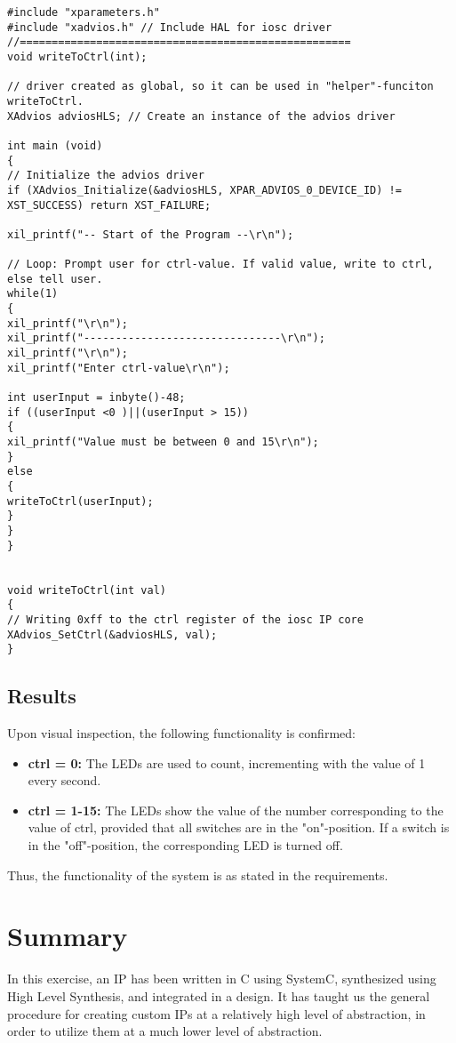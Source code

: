 \begin{lstlisting}
#include "xparameters.h"
#include "xadvios.h" // Include HAL for iosc driver
//====================================================
void writeToCtrl(int);

// driver created as global, so it can be used in "helper"-funciton writeToCtrl.
XAdvios adviosHLS; // Create an instance of the advios driver

int main (void)
{
// Initialize the advios driver
if (XAdvios_Initialize(&adviosHLS, XPAR_ADVIOS_0_DEVICE_ID) != XST_SUCCESS) return XST_FAILURE;

xil_printf("-- Start of the Program --\r\n");

// Loop: Prompt user for ctrl-value. If valid value, write to ctrl, else tell user.
while(1)
{
xil_printf("\r\n");
xil_printf("-------------------------------\r\n");
xil_printf("\r\n");
xil_printf("Enter ctrl-value\r\n");

int userInput = inbyte()-48;
if ((userInput <0 )||(userInput > 15))
{
xil_printf("Value must be between 0 and 15\r\n");
}
else
{
writeToCtrl(userInput);
}
}
}


void writeToCtrl(int val)
{
// Writing 0xff to the ctrl register of the iosc IP core
XAdvios_SetCtrl(&adviosHLS, val);
}
\end{lstlisting}
\subsection{Results}
Upon visual inspection, the following functionality is confirmed:
\begin{itemize}
	\item \textbf{ctrl = 0:} The LEDs are used to count, incrementing with the value of 1 every second.
	\item \textbf{ctrl = 1-15:} The LEDs show the value of the number corresponding to the value of ctrl, provided that all switches are in the "on"-position. If a switch is in the "off"-position, the corresponding LED is turned off. 
\end{itemize}

Thus, the functionality of the system is as stated in the requirements.

\section{Summary}
In this exercise, an IP has been written in C using SystemC, synthesized using High Level Synthesis, and integrated in a design. It has taught us the general procedure for creating custom IPs at a relatively high level of abstraction, in order to utilize them at a much lower level of abstraction.